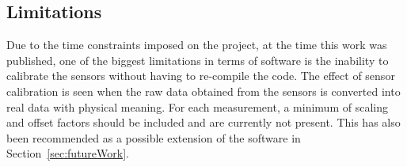 \subsection{Limitations}
Due to the time constraints imposed on the project, at the time this work was published, one of the biggest limitations in terms of software is the inability to calibrate the sensors without having to re-compile the code.  The effect of sensor calibration is seen when the raw data obtained from the sensors is converted into real data with physical meaning.  For each measurement, a minimum of scaling and offset factors should be included and are currently not present.  This has also been recommended as a possible extension of the software in Section~\ref{sec:futureWork}. 